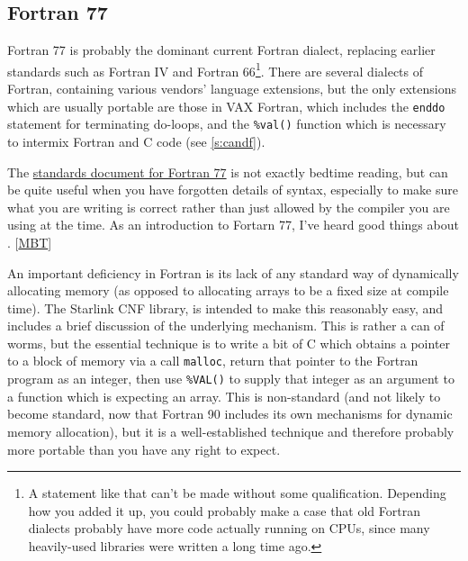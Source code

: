 \documentclass[11pt,oneside,chapters]{starlink}
\begin{document}
\subsection{Fortran 77}
\label{s:fortran77}

Fortran 77 is probably the dominant current Fortran dialect,
replacing earlier standards such as Fortran IV and Fortran 66\footnote{A
statement like that can't be made without some qualification.
Depending how you added it up, you could probably make a case that old
Fortran dialects probably have more code actually running on CPUs,
since many heavily-used libraries were written a long time
ago.}.  There are several dialects of Fortran, containing
various vendors' language extensions, but the only extensions which
are usually portable are those in VAX Fortran, which includes the
\texttt{enddo} statement for terminating do-loops, and the
\texttt{\%val()} function which is necessary to intermix Fortran
and C code (see \ref{s:candf}).

The \href{http://www.fortran.com/fortran/F77\_std/rjcnf.html}{standards document for Fortran 77}
is not exactly bedtime reading,
but can be quite useful when you have forgotten details of syntax,
especially to make sure what you are writing is correct rather than
just allowed by the compiler you are using at the time.  As an
introduction to Fortarn 77, I've heard good things about
\citet{metcalf85}. [\hyperlink{ta:mbt}{MBT}]

An important deficiency in Fortran is its lack of any
standard way of dynamically allocating memory (as opposed
to allocating arrays to be a fixed size at compile time).
The Starlink CNF library,
 is intended to make
this reasonably easy, and includes a brief discussion of
the underlying mechanism.  This is rather a can of worms,
but the essential technique is to write a bit of C which
obtains a pointer to a block of memory via a call
\texttt{malloc}, return that pointer to the Fortran
program as an integer, then use \texttt{\%VAL()} to
supply that integer as an argument to a function which is
expecting an array.  This is non-standard (and not likely
to become standard, now that Fortran 90 includes its own
mechanisms for dynamic memory allocation), but it is a
well-established technique and therefore probably more
portable than you have any right to expect.

\end{document}
